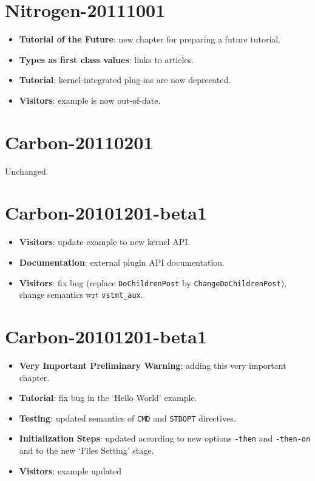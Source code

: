 \section*{Nitrogen-20111001}

\begin{itemize}
\item \textbf{Tutorial of the Future}: new chapter for preparing a future
  tutorial.
\item \textbf{Types as first class values}: links to articles.
\item \textbf{Tutorial}: kernel-integrated plug-ins are now deprecated.
\item \textbf{Visitors}: example is now out-of-date.
\end{itemize}

\section*{Carbon-20110201}

Unchanged.

\section*{Carbon-20101201-beta1}

\begin{itemize}
\item \textbf{Visitors}: update example to new kernel API.
\item \textbf{Documentation}: external plugin API documentation.
\item \textbf{Visitors}: fix bug (replace \texttt{DoChildrenPost} by
  \texttt{ChangeDoChildrenPost}), change semantics wrt \verb+vstmt_aux+.
\end{itemize}

\section*{Carbon-20101201-beta1}

\begin{itemize}
\item \textbf{Very Important Preliminary Warning}: adding this very important
  chapter.
\item \textbf{Tutorial}: fix bug in the `Hello World' example.
\item \textbf{Testing}: updated semantics of \texttt{CMD} and
  \texttt{STDOPT} directives.
\item \textbf{Initialization Steps}: updated according to new options
  \texttt{-then} and \texttt{-then-on} and to the new `Files Setting' stage.
\item \textbf{Visitors}: example updated
\end{itemize}

